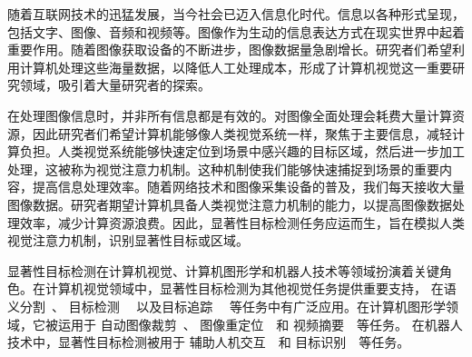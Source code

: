 



%
%
%
%
%
%
%
%
%
%
%





\label{chap:part1}

随着互联网技术的迅猛发展，当今社会已迈入信息化时代。信息以各种形式呈现，包括文字、图像、音频和视频等。图像作为生动的信息表达方式在现实世界中起着重要作用。随着图像获取设备的不断进步，图像数据量急剧增长。研究者们希望利用计算机处理这些海量数据，以降低人工处理成本，形成了计算机视觉这一重要研究领域，吸引着大量研究者的探索。

在处理图像信息时，并非所有信息都是有效的。对图像全面处理会耗费大量计算资源，因此研究者们希望计算机能够像人类视觉系统一样，聚焦于主要信息，减轻计算负担。人类视觉系统能够快速定位到场景中感兴趣的目标区域，然后进一步加工处理，这被称为视觉注意力机制。这种机制使我们能够快速捕捉到场景的重要内容，提高信息处理效率。随着网络技术和图像采集设备的普及，我们每天接收大量图像数据。研究者期望计算机具备人类视觉注意力机制的能力，以提高图像数据处理效率，减少计算资源浪费。因此，显著性目标检测任务应运而生，旨在模拟人类视觉注意力机制，识别显著性目标或区域。


显著性目标检测在计算机视觉、计算机图形学和机器人技术等领域扮演着关键角色。在计算机视觉领域中，显著性目标检测为其他视觉任务提供重要支持，
在语义分割~\cite{li2014secrets}、
目标检测~\cite{dai2016r}~
以及目标追踪~\cite{smeulders2013visual}~
等任务中有广泛应用。在计算机图形学领域，它被运用于
自动图像裁剪~\cite{wang2018deep}、
图像重定位~\cite{sun2011scale}~和
视频摘要~\cite{ma2002user}~等任务。
在机器人技术中，显著性目标检测被用于
辅助人机交互~\cite{sugano2010calibration}~和
目标识别~\cite{karpathy2013object}~等任务。


